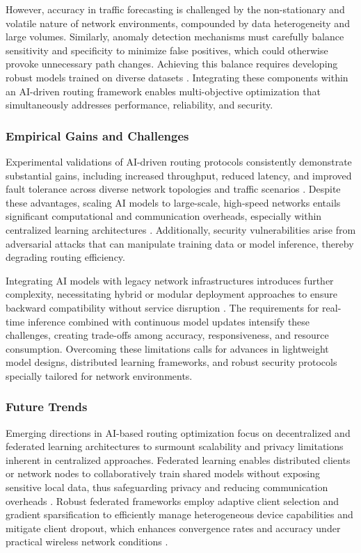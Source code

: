 However, accuracy in traffic forecasting is challenged by the non-stationary and volatile nature of network environments, compounded by data heterogeneity and large volumes. Similarly, anomaly detection mechanisms must carefully balance sensitivity and specificity to minimize false positives, which could otherwise provoke unnecessary path changes. Achieving this balance requires developing robust models trained on diverse datasets \cite{ref50}. Integrating these components within an AI-driven routing framework enables multi-objective optimization that simultaneously addresses performance, reliability, and security.

\subsubsection{Empirical Gains and Challenges}

Experimental validations of AI-driven routing protocols consistently demonstrate substantial gains, including increased throughput, reduced latency, and improved fault tolerance across diverse network topologies and traffic scenarios \cite{ref4}. Despite these advantages, scaling AI models to large-scale, high-speed networks entails significant computational and communication overheads, especially within centralized learning architectures \cite{ref53}. Additionally, security vulnerabilities arise from adversarial attacks that can manipulate training data or model inference, thereby degrading routing efficiency.

Integrating AI models with legacy network infrastructures introduces further complexity, necessitating hybrid or modular deployment approaches to ensure backward compatibility without service disruption \cite{ref48}. The requirements for real-time inference combined with continuous model updates intensify these challenges, creating trade-offs among accuracy, responsiveness, and resource consumption. Overcoming these limitations calls for advances in lightweight model designs, distributed learning frameworks, and robust security protocols specially tailored for network environments.

\subsubsection{Future Trends}

Emerging directions in AI-based routing optimization focus on decentralized and federated learning architectures to surmount scalability and privacy limitations inherent in centralized approaches. Federated learning enables distributed clients or network nodes to collaboratively train shared models without exposing sensitive local data, thus safeguarding privacy and reducing communication overheads \cite{ref53}. Robust federated frameworks employ adaptive client selection and gradient sparsification to efficiently manage heterogeneous device capabilities and mitigate client dropout, which enhances convergence rates and accuracy under practical wireless network conditions \cite{ref49}.

